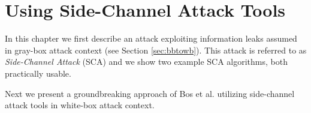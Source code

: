 \chapter{Using Side-Channel Attack Tools}
\label{chap:attack}

In this chapter we first describe an attack exploiting information leaks assumed in gray-box attack context (see Section \ref{sec:bbtowb}). This attack is referred to as {\em Side-Channel Attack} (SCA) and we show two example SCA algorithms, both practically usable.

Next we present a groundbreaking approach of Bos et al. \cite{bos2015differential} utilizing side-channel attack tools in white-box attack context.




